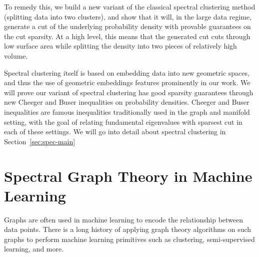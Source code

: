 To remedy this, we build a new variant of the classical spectral
clustering method (splitting data into two clusters), and show that it
will, in the large data regime, generate a cut of the underlying probability
density with provable guarantees on the cut sparsity. At a high level,
this means that the generated cut cuts through low surface area while splitting the density into
two pieces of relatively high volume.

Spectral clustering itself is based on embedding data into new geometric
spaces, and thus the use of geometric embeddings features prominently in
our work. We will prove our variant of spectral clustering has good
sparsity guarantees through new Cheeger and Buser inequalities on
probability densities. Cheeger and Buser inequalities are famous
inequalities traditionally used in the graph and manifold setting, with
the goal of relating fundamental eigenvalues with sparsest cut in each
of these settings. We will go into detail about spectral clustering in
Section~\ref{sec:spec-main}

\section{Spectral Graph Theory in Machine
  Learning}\label{sec:sgt}
  Graphs are often used in machine learning to encode the relationship
  between data points. There is a long history of applying graph theory
  algorithms on such graphs to perform machine learning primitives such
  as clustering, semi-supervised learning, and more.

